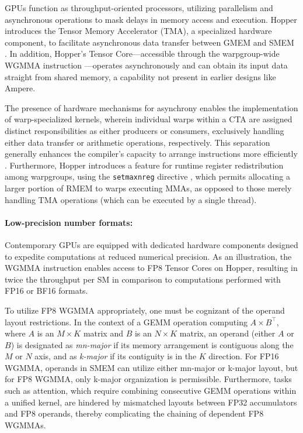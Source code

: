 GPUs function as throughput-oriented processors, utilizing parallelism and asynchronous operations to mask delays in memory access and execution. Hopper introduces the Tensor Memory Accelerator (TMA), a specialized hardware component, to facilitate asynchronous data transfer between GMEM and SMEM \cite[\S7.29]{cuda}. In addition, Hopper’s Tensor Core—accessible through the warpgroup-wide WGMMA instruction \cite[\S9.7.14]{ptx}—operates asynchronously and can obtain its input data straight from shared memory, a capability not present in earlier designs like Ampere.

The presence of hardware mechanisms for asynchrony enables the implementation of warp-specialized kernels, wherein individual warps within a CTA are assigned distinct responsibilities as either producers or consumers, exclusively handling either data transfer or arithmetic operations, respectively. This separation generally enhances the compiler’s capacity to arrange instructions more efficiently \citep{warp-specialization-2011}. Furthermore, Hopper introduces a feature for runtime register redistribution among warpgroups, using the \verb|setmaxnreg| directive \cite[\S9.7.17.1]{ptx}, which permits allocating a larger portion of RMEM to warps executing MMAs, as opposed to those merely handling TMA operations (which can be executed by a single thread).

\paragraph{Low-precision number formats:}
\label{sec:low-precision-gpu}
Contemporary GPUs are equipped with dedicated hardware components designed to expedite computations at reduced numerical precision. As an illustration, the WGMMA instruction enables access to FP8 Tensor Cores on Hopper, resulting in twice the throughput per SM in comparison to computations performed with FP16 or BF16 formats.

To utilize FP8 WGMMA appropriately, one must be cognizant of the operand layout restrictions. In the context of a GEMM operation computing $A \times B^{\top}$, where $A$ is an $M\times K$ matrix and $B$ is an $N\times K$ matrix, an operand (either $A$ or $B$) is designated as \emph{mn-major} if its memory arrangement is contiguous along the $M$ or $N$ axis, and as \emph{k-major} if its contiguity is in the $K$ direction. For FP16 WGMMA, operands in SMEM can utilize either mn-major or k-major layout, but for FP8 WGMMA, only k-major organization is permissible. Furthermore, tasks such as attention, which require combining consecutive GEMM operations within a unified kernel, are hindered by mismatched layouts between FP32 accumulators and FP8 operands, thereby complicating the chaining of dependent FP8 WGMMAs.

